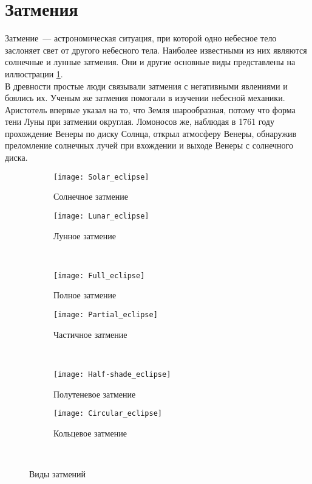 \documentclass[30pt]{article}
\begin{document}
    \section{Затмения}
        Затмение~--- астрономическая ситуация, при которой одно небесное тело заслоняет свет от другого небесного тела. Наиболее известными из них являются солнечные и лунные затмения. Они и другие основные виды представлены на иллюстрации \ref{pic:eclipses}.\\
        В древности простые люди связывали затмения с негативными явлениями и боялись их. Ученым же затмения помогали в изучении небесной механики. Аристотель впервые указал на то, что Земля шарообразная, потому что форма тени Луны при затмении округлая. Ломоносов же, наблюдая в 1761 году прохождение Венеры по диску Солнца, открыл атмосферу Венеры,  обнаружив преломление солнечных лучей при вхождении и выходе Венеры с солнечного диска.
        \begin{figure}[p]
            \centering
            \begin{subfigure}[b]{0.45\textwidth}
                \texttt{[image: Solar\_eclipse]}
                \caption{Солнечное затмение}
            \end{subfigure}
            \begin{subfigure}[b]{0.45\textwidth}
                \texttt{[image: Lunar\_eclipse]}
                \caption{Лунное затмение}
            \end{subfigure}\\
            \begin{subfigure}[b]{0.45\textwidth}
                \texttt{[image: Full\_eclipse]}
                \caption{Полное затмение}
            \end{subfigure}
            \begin{subfigure}[b]{0.45\textwidth}
                \texttt{[image: Partial\_eclipse]}
                \caption{Частичное затмение}
            \end{subfigure}\\
            \begin{subfigure}[b]{0.45\textwidth}
                \texttt{[image: Half-shade\_eclipse]}
                \caption{Полутеневое затмение}
            \end{subfigure}
            \begin{subfigure}[b]{0.45\textwidth}
                \texttt{[image: Circular\_eclipse]}
                \caption{Кольцевое затмение}
            \end{subfigure}\\
            \caption{Виды затмений}
            \label{pic:eclipses}
            
        \end{figure}\\
\end{document}
